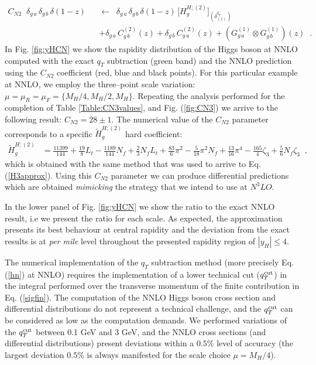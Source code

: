 \documentclass[12pt]{article}
\def\beeq{\begin{eqnarray}}
\def\eeeq{\end{eqnarray}}
\def\nn{\nonumber}
\newcommand\f[2]{\frac{#1}{#2}}
\def\qt{q_T}
\begin{document}
\beeq
\label{CNeq}
C_{N2}\;\;\delta_{g\,a} \,\delta_{g\,b} \,\delta(1-z) && \!\!\!\!\!\! \leftarrow\;\; \delta_{g\,a} \,\delta_{g\,b} \,\delta(1-z)
\, \big[H^{H;(2)}_{g}\big]_{(\delta^{\qt}_{(1)})}\nn\\
&&+\delta_{g\,a} \,C^{(2)}_{g\,b}(z)+\delta_{g\,b} \,C^{(2)}_{g\,a}(z)+
\left(G^{(1)}_{g\,a}\otimes G^{(1)}_{g\,b}\right)(z)\;\; .
\eeeq 
In Fig. \ref{fig:yHCN} we show the rapidity distribution of the Higgs boson at NNLO computed with the exact $\qt$ subtraction (green band) and the NNLO prediction using the $C_{N2}$ coefficient (red, blue and black points). For this particular example at NNLO, we employ the three--point scale variation: $\mu=\mu_{R}=\mu_{F}=\{M_{H}/4,M_{H}/2,M_{H}\}$. Repeating the analysis performed for the completion of Table \ref{Table:CN3values}, and Fig. (\ref{fig:CN3}) we arrive to the following result: $C_{N2}=28\pm 1$. The numerical value of the $C_{N2}$ parameter corresponds to a specific $\widetilde{H}^{H;(2)}_{g}$ hard coefficient:
\begin{align}
\label{Ht2g}
\widetilde{H}^{H;(2)}_{g}&=\f{11399}{144}+\f{19}{8} L_{t}-\f{1189}{144} N_{f}+\f{2}{3} N_{f} L_{t}+\f{83}{6} \pi^{2} -\f{5}{18} \pi^{2} N_{f} + \f{13}{16} \pi^{4} - \f{165}{4} \zeta_{3} + \f{5}{6} N_{f} \zeta_{3}\;\;,
\end{align}
which is obtained with the same method that was used to arrive to Eq. (\ref{H3approx}).
Using this $C_{N2}$ parameter we can produce differential predictions which are obtained \textit{mimicking} the strategy that we intend to use at $N^{3}LO$. 

In the lower panel of Fig. \ref{fig:yHCN} we show the ratio to the exact NNLO result, i.e we present the ratio for each scale. As expected, the approximation presents its best behaviour at central rapidity and the deviation from the exact results is at \textit{per mile} level throughout the presented rapidity region of $|y_{H}|\leq 4$.

The numerical implementation of the $\qt$ subtraction method (more precisely Eq. (\ref{hn}) at NNLO) requires the implementation of a lower technical cut ($q_{T}^{\rm cut}$) in the integral performed over the transverse momentum of the finite contribution in Eq. (\ref{sigfin}). The computation of the NNLO Higgs boson cross section and differential distributions do not represent a technical challenge, and the $q_{T}^{\rm cut}$ can be considered as low as the computation demands. We performed variations of the $q_{T}^{\rm cut}$ between 0.1 GeV and 3 GeV, and the NNLO cross sections (and differential distributions) present deviations within a $0.5\%$ level of accuracy (the largest deviation $0.5\%$ is always manifested for the scale choice $\mu=M_{H}/4$).
\end{document}
